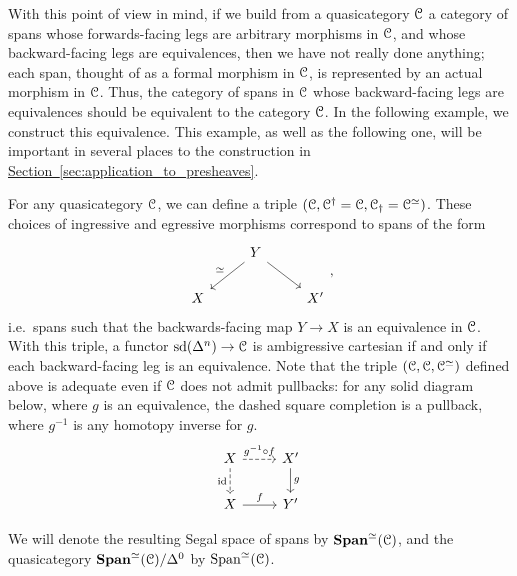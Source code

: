 \documentclass[main.tex]{subfiles}
\begin{document}
With this point of view in mind, if we build from a quasicategory $\mathcal{C}$ a category of spans whose forwards-facing legs are arbitrary morphisms in $\mathcal{C}$, and whose backward-facing legs are equivalences, then we have not really done anything; each span, thought of as a formal morphism in $\mathcal{C}$, is represented by an actual morphism in $\mathcal{C}$. Thus, the category of spans in $\mathcal{C}$ whose backward-facing legs are equivalences should be equivalent to the category $\mathcal{C}$. In the following example, we construct this equivalence. This example, as well as the following one, will be important in several places to the construction in \hyperref[sec:application_to_presheaves]{Section~\ref*{sec:application_to_presheaves}}.

\begin{example}
  \label{eg:spans_with_equivalences_on_one_leg}
  For any quasicategory $\mathcal{C}$, we can define a triple $(\mathcal{C}, \mathcal{C}^{\dagger} = \mathcal{C}, \mathcal{C}_{\dagger} = \mathcal{C}^{\simeq})$. These choices of ingressive and egressive morphisms correspond to spans of the form
  \begin{equation*}
    \begin{tikzcd}
      & Y
      \arrow[dl, swap, "\simeq"]
      \arrow[dr]
      \\
      X
      && X'
    \end{tikzcd},
  \end{equation*}
  i.e.\ spans such that the backwards-facing map $Y \to X$ is an equivalence in $\mathcal{C}$. With this triple, a functor $\mathrm{sd}(\Delta^{n}) \to \mathcal{C}$ is ambigressive cartesian if and only if each backward-facing leg is an equivalence. Note that the triple $(\mathcal{C}, \mathcal{C}, \mathcal{C}^{\simeq})$ defined above is adequate even if $\mathcal{C}$ does not admit pullbacks: for any solid diagram below, where $g$ is an equivalence, the dashed square completion is a pullback, where $g^{-1}$ is any homotopy inverse for $g$.
  \begin{equation*}
    \begin{tikzcd}
      X
      \arrow[r, dashed, "g^{-1} \circ f"]
      \arrow[d, swap, dashed, "\id"]
      & X'
      \arrow[d, "g"]
      \\
      X
      \arrow[r, "f"]
      & Y'
    \end{tikzcd}
  \end{equation*}

  We will denote the resulting Segal space of spans by $\mathbf{Span}^{\simeq}(\mathcal{C})$, and the quasicategory $\mathbf{Span}^{\simeq}(\mathcal{C})/\Delta^{0}$ by $\mathrm{Span}^{\simeq}(\mathcal{C})$. 


\end{example}
\end{document}
